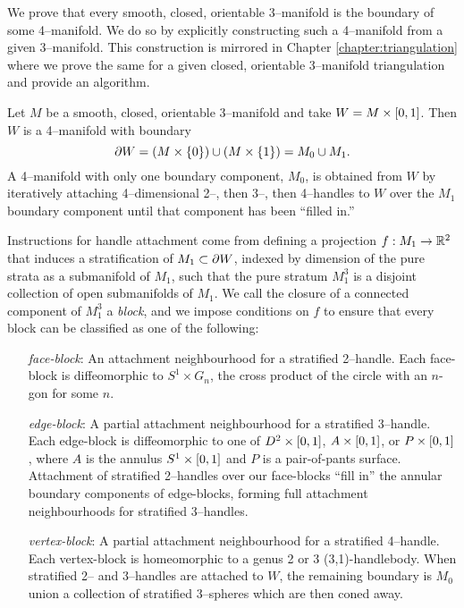 \label{chapter:smooth}

We prove that every smooth, closed, orientable 3--manifold is the boundary of some 4--manifold.
We do so by explicitly constructing such a 4--manifold from a given 3--manifold.
This construction is mirrored in Chapter \ref{chapter:triangulation} where we prove the same for a given closed, orientable 3--manifold triangulation and provide an algorithm.

Let $M$ be a smooth, closed, orientable 3--manifold and take $W=M\times [0,1]$.
Then $W$ is a 4--manifold with boundary
\[
	\partial W = (M\times\{0\}) \cup (M\times\{1\}) = M_0 \cup M_1.
\]
A 4--manifold with only one boundary component, $M_0$, is obtained from $W$ by iteratively attaching 4--dimensional 2--, then 3--, then 4--handles to $W$ over the $M_1$ boundary component until that component has been ``filled in.''

Instructions for handle attachment come from defining a projection $f:M_1\to \mathbb{R}^2$ that induces a stratification of $M_1\subset\partial W$, indexed by dimension of the pure strata as a submanifold of $M_1$, such that the pure stratum $M_1^3$ is a disjoint collection of open submanifolds of $M_1$.
We call the closure of a connected component of $M_1^3$ a \emph{block}, and we impose conditions on $f$ to ensure that every block can be classified as one of the following:
\begin{enumerate}
	\item[\emph{face-block}:]
		An attachment neighbourhood for a stratified 2--handle.
		Each face-block is diffeomorphic to $S^1\times G_n$, the cross product of the circle with an $n$-gon for some $n$.
	
	\item[\emph{edge-block}:]
		A partial attachment neighbourhood for a stratified 3--handle.
		Each edge-block is diffeomorphic to one of $D^2\times[0,1]$, $A\times[0,1]$, or $P\times[0,1]$, where $A$ is the annulus $S^1\times[0,1]$ and $P$ is a pair-of-pants surface.
		Attachment of stratified 2--handles over our face-blocks ``fill in'' the annular boundary components of edge-blocks, forming full attachment neighbourhoods for stratified 3--handles.
		
	\item[\emph{vertex-block}:]
		A partial attachment neighbourhood for a stratified 4--handle.
		Each vertex-block is homeomorphic to a genus 2 or 3 (3,1)-handlebody.
		When stratified 2-- and 3--handles are attached to $W$, the remaining boundary is $M_0$ union a collection of stratified 3--spheres which are then coned away.
\end{enumerate}
 
